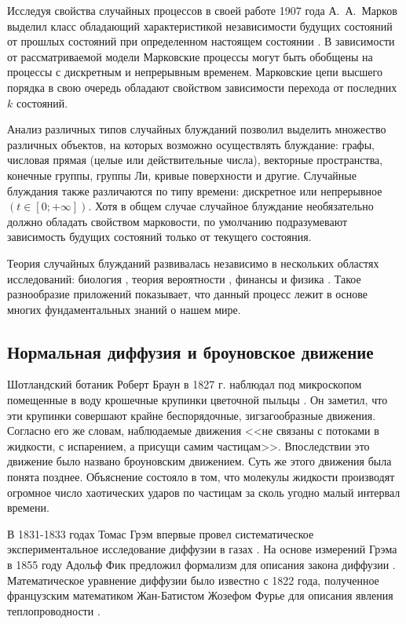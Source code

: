 Исследуя свойства случайных процессов в своей работе 1907 года А.~А.~Марков выделил класс обладающий характеристикой независимости будущих состояний от прошлых состояний при определенном настоящем состоянии \cite{shiryaev_2021}. В зависимости от рассматриваемой модели Марковские процессы могут быть обобщены на процессы с дискретным и непрерывным временем. Марковские цепи высшего порядка в свою очередь обладают свойством зависимости перехода от последних $k$ состояний.

Анализ различных типов случайных блужданий позволил выделить множество различных объектов, на которых возможно осуществлять блуждание: графы, числовая прямая (целые или действительные числа), векторные пространства, конечные группы, группы Ли, кривые поверхности и другие. Случайные блуждания также различаются по типу времени: дискретное или непрерывное $(t \in [0; +\infty])$. Хотя в общем случае случайное блуждание необязательно должно обладать свойством марковости, по умолчанию подразумевают зависимость будущих состояний только от текущего состояния.

Теория случайных блужданий развивалась независимо в нескольких областях исследований: биология \cite{chowdhury_100_2005}, теория вероятности \cite{strecker_alexandr_2011}, финансы \cite{bachelier_theorie_1900} и физика \cite{pearson_problem_1905,rayleigh_problem_1905}. Такое разнообразие приложений показывает, что данный процесс лежит в основе многих фундаментальных знаний о нашем мире.

\subsection{Нормальная диффузия и броуновское движение}\label{subsec:ch1/sec2/sub1}

Шотландский ботаник Роберт Браун в 1827 г. наблюдал под микроскопом помещенные в воду крошечные крупинки цветочной пыльцы \cite{brown_brief_2015}. Он заметил, что эти крупинки совершают крайне беспорядочные, зигзагообразные движения. Согласно его же словам, наблюдаемые движения <<не связаны с потоками в жидкости, с испарением, а присущи самим частицам>>. Впоследствии это движение было названо броуновским движением. Суть же этого движения была понята позднее. Объяснение состояло в том, что молекулы жидкости производят огромное число хаотических ударов по частицам за сколь угодно малый интервал времени.

В 1831-1833 годах Томас Грэм впервые провел систематическое экспериментальное исследование диффузии в газах \cite{}. На основе измерений Грэма в 1855 году Адольф Фик предложил формализм для описания закона диффузии \cite{}. Математическое уравнение диффузии было известно с 1822 года, полученное французским математиком Жан-Батистом Жозефом Фурье для описания явления теплопроводности \cite{fourier_theorie_1822}. 

